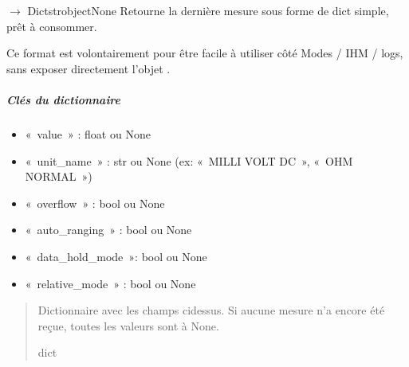 \documentclass[letterpaper,10pt,french]{sphinxmanual}
\begin{document}
\begin{fulllineitems}
\begin{fulllineitems}
\begin{quote}
\begin{description}
\end{description}\end{quote}

\end{fulllineitems}


\begin{fulllineitems}
\label{\detokenize{api/hardware.devices:hardware.devices.owon_multimeter.OwonMultimeterDriver.get_last_measure}}
\pysigstartsignatures
\pysiglinewithargsret
{}
{}
{{ $\rightarrow$ Dict\DUrole{p}{{[}}strobjectNone\DUrole{p}{{]}}}}
\pysigstopsignatures
\sphinxAtStartPar
Retourne la dernière mesure sous forme de dict simple, prêt à consommer.

\sphinxAtStartPar
Ce format est volontairement  pour être facile à utiliser
côté Modes / IHM / logs, sans exposer directement l’objet .


\subparagraph{Clés du dictionnaire}
\label{\detokenize{api/hardware.devices:cles-du-dictionnaire}}\begin{itemize}
\item {} 
\sphinxAtStartPar
« value »         : float ou None

\item {} 
\sphinxAtStartPar
« unit\_name »     : str ou None (ex: « MILLI VOLT DC », « OHM NORMAL »)

\item {} 
\sphinxAtStartPar
« overflow »      : bool ou None

\item {} 
\sphinxAtStartPar
« auto\_ranging »  : bool ou None

\item {} 
\sphinxAtStartPar
« data\_hold\_mode »: bool ou None

\item {} 
\sphinxAtStartPar
« relative\_mode » : bool ou None

\end{itemize}
\begin{quote}\begin{description}
\sphinxAtStartPar
Dictionnaire avec les champs ci\sphinxhyphen{}dessus. Si aucune mesure n’a
encore été reçue, toutes les valeurs sont à None.

\sphinxAtStartPar
dict

\end{description}\end{quote}

\end{fulllineitems}


\end{fulllineitems}
\end{document}
